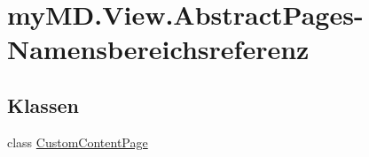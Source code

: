 \hypertarget{namespacemy_m_d_1_1_view_1_1_abstract_pages}{}\section{my\+M\+D.\+View.\+Abstract\+Pages-\/\+Namensbereichsreferenz}
\label{namespacemy_m_d_1_1_view_1_1_abstract_pages}
\subsection*{Klassen}
\begin{DoxyCompactItemize}
\item 
class \mbox{\hyperlink{classmy_m_d_1_1_view_1_1_abstract_pages_1_1_custom_content_page}{Custom\+Content\+Page}}
\end{DoxyCompactItemize}
